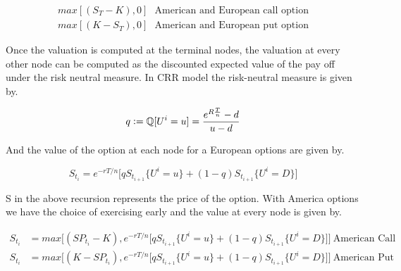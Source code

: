 \documentclass[12pt]{report}
\newcommand{\defeq}{\vcentcolon=}
\begin{document}
\begin{equation*}
	\begin{aligned}
		max[(S_T - K),0] \ \ \  \text{American and European call option} \\
		max[(K - S_T),0] \ \ \  \text{American and European put option}
	\end{aligned}
\end{equation*}

Once the valuation is computed at the terminal nodes, the valuation at every other node can be computed as the discounted expected value of the pay off under the risk neutral measure. In CRR model the risk-neutral measure is given by.

\begin{equation*}
	q \defeq \mathbb{Q}[U^i = u] = \frac{e^{R \frac{T}{n}} - d}{ u - d}
\end{equation*}

And the value of the option at each node for a European options are given by. 

\begin{equation*}
	S_{t_i} = e^{-rT/n} \Big[ qS_{t_{i+1}}\{U^i=u\} + (1-q)S_{t_{i+1}}\{U^i=D\}\Big]
\end{equation*}

S in the above recursion represents the price of the option. With America  options we have the choice of exercising early and the value at every node is given by.

\begin{equation*}
	\begin{aligned}
		S_{t_i} &= max\Big[(SP_{t_i} - K), e^{-rT/n} \big[ qS_{t_{i+1}}\{U^i=u\} + (1-q)S_{t_{i+1}}\{U^i=D\}\big] \Big]  \ \text{American Call}\\
		S_{t_i} &= max\Big[(K - SP_{t_i}), e^{-rT/n} \big[ qS_{t_{i+1}}\{U^i=u\} + (1-q)S_{t_{i+1}}\{U^i=D\}\big] \Big] \  \text{American Put}
	\end{aligned}
\end{equation*}
\end{document}
